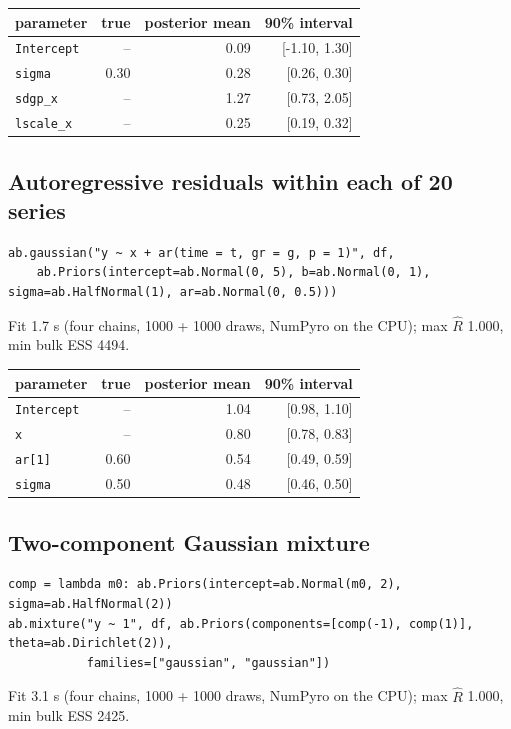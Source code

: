 \documentclass[11pt]{article}
\newcommand{\code}[1]{\texttt{#1}}
\begin{document}
\begin{center}\begin{tabular}{@{}lrrr@{}}\toprule parameter & true & posterior mean & 90\% interval \\ \midrule
\code{Intercept} & -- & 0.09 & [-1.10, 1.30] \\
\code{sigma} & 0.30 & 0.28 & [0.26, 0.30] \\
\code{sdgp\_x} & -- & 1.27 & [0.73, 2.05] \\
\code{lscale\_x} & -- & 0.25 & [0.19, 0.32] \\
\bottomrule\end{tabular}\end{center}\normalsize

\subsection*{Autoregressive residuals within each of 20 series}
\begin{lstlisting}
ab.gaussian("y ~ x + ar(time = t, gr = g, p = 1)", df,
    ab.Priors(intercept=ab.Normal(0, 5), b=ab.Normal(0, 1), sigma=ab.HalfNormal(1), ar=ab.Normal(0, 0.5)))
\end{lstlisting}
\noindent\small Fit 1.7 s (four chains, 1000 + 1000 draws, NumPyro on the CPU); max $\hat R$ 1.000, min bulk ESS 4494.

\begin{center}\begin{tabular}{@{}lrrr@{}}\toprule parameter & true & posterior mean & 90\% interval \\ \midrule
\code{Intercept} & -- & 1.04 & [0.98, 1.10] \\
\code{x} & -- & 0.80 & [0.78, 0.83] \\
\code{ar[1]} & 0.60 & 0.54 & [0.49, 0.59] \\
\code{sigma} & 0.50 & 0.48 & [0.46, 0.50] \\
\bottomrule\end{tabular}\end{center}\normalsize

\subsection*{Two-component Gaussian mixture}
\begin{lstlisting}
comp = lambda m0: ab.Priors(intercept=ab.Normal(m0, 2), sigma=ab.HalfNormal(2))
ab.mixture("y ~ 1", df, ab.Priors(components=[comp(-1), comp(1)], theta=ab.Dirichlet(2)),
           families=["gaussian", "gaussian"])
\end{lstlisting}
\noindent\small Fit 3.1 s (four chains, 1000 + 1000 draws, NumPyro on the CPU); max $\hat R$ 1.000, min bulk ESS 2425.
\end{document}
